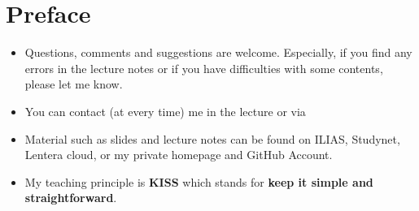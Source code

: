 
	\chapter*{Preface}

\begin{itemize}
	\item Questions, comments and suggestions are welcome. Especially, if you find any errors in the lecture notes or if you have difficulties with some contents, please let me know. 
	\item You can contact (at every time) me in the lecture or via 
	\item Material such as slides and lecture notes can be found on ILIAS, Studynet, Lentera cloud, or my private homepage and GitHub Account.
\pbn
	\item 	My teaching principle is \textbf{KISS} which stands for \textbf{keep it simple and straightforward}.


\end{itemize}
